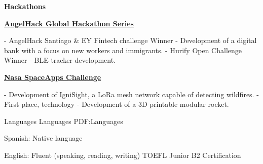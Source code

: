 \documentclass[letterpaper,yyyy,draft]{simpleresumecv}
\begin{document}
\begin{Body}
{    \Gap
    \Entry
    \textbf{Hackathons}
    {
        {
            \BulletItem
            \href{https://angelhack.com}{\textbf{AngelHack Global Hackathon Series}}
            \hfill
            \begin{Detail}
                \Gap
                 - AngelHack Santiago \& EY Fintech challenge Winner - \newline Development of a digital bank with a focus on new workers and immigrants.
                \Gap
                 - Hurify Open Challenge Winner - BLE tracker development.
            \end{Detail}
        }
        {
            \Gap
            \BulletItem
            \href{https://spaceappschallenge.org}{\textbf{Nasa SpaceApps Challenge}}
            \hfill
            \begin{Detail}
                \Gap
                 - Development of IgniSight, a LoRa mesh network capable of detecting wildfires.
                \Gap
                 - First place, technology - Development of a 3D printable modular rocket.
            \end{Detail}
        }
    }
}


\Section
{Languages}
{Languages}
{PDF:Languages}
{
    {
        \BulletItem
        Spanish: Native language
    }

    \Gap

    {
        \BulletItem
        English: Fluent (speaking, reading, writing)
        \SubBulletItem
        TOEFL Junior B2 Certification
    }
}
\end{Body}
\end{document}
